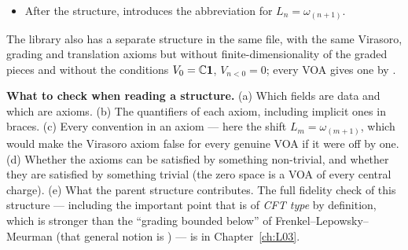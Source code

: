 \begin{example}
\begin{itemize}
  Example~\ref{ch01:ex:mode},  is $\omega_{(m+1)} = L_m$, so
  this is the Virasoro relation.  has an implicit weight ;
   uses the formal derivative ;  uses the line
  ;  and  use .
\item After the structure,  introduces the abbreviation  for
  $L_n = \omega_{(n+1)}$.
\end{itemize}
The library also has a separate structure  in the same file, with the same
Virasoro, grading and translation axioms but without finite-dimensionality of the graded pieces and
without the conditions $V_0 = {\mathbb{C}}\mathbf{1}$, $V_{n<0}=0$; every VOA gives one by
.
\end{example}

\begin{dictionary}
\textbf{What to check when reading a structure.} (a) Which fields are data and which are axioms.
(b) The quantifiers of each axiom, including implicit ones in braces. (c) Every convention in an
axiom --- here the shift $L_m = \omega_{(m+1)}$, which would make the Virasoro axiom false for every
genuine VOA if it were off by one. (d) Whether the axioms can be satisfied by something non-trivial,
and whether they are satisfied by something trivial (the zero space is a VOA of every central
charge). (e) What the parent structure contributes. The full fidelity check of this structure ---
including the important point that  is of \emph{CFT type} by definition, which is
stronger than the ``grading bounded below'' of Frenkel--Lepowsky--Meurman (that general notion is
) --- is in Chapter~\ref{ch:L03}.
\end{dictionary}

